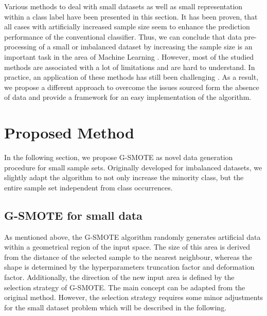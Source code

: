 \documentclass[parskip=full]{scrartcl}
\begin{document}
Various methods to deal with small datasets as well as small representation 
within a class label have been presented in this section. It has been proven, 
that all cases with artificially increased sample size seem to enhance the 
prediction performance of the conventional classifier. Thus, we can conclude 
that data pre-processing of a small or imbalanced dataset by increasing the 
sample size is an important task in the area of Machine Learning 
\cite{Ruparel.2013}. However, most of the studied methods are associated with a 
lot of limitations and are hard to understand. In practice, an application of 
these methods has still been challenging \cite{Sezer.2014}. As a result, we 
propose a different approach to overcome the issues sourced form the absence of 
data and provide a framework for an easy implementation of the algorithm.

\section{Proposed Method}

In the following section, we propose G-SMOTE as novel data generation procedure 
for small sample sets. Originally developed for imbalanced datasets, we 
slightly adapt the algorithm to not only increase the minority class, but the 
entire sample set independent from class occurrences. 

\subsection{G-SMOTE for small data}

As mentioned above, the G-SMOTE algorithm randomly generates artificial data 
within a geometrical region of the input space. The size of this area is 
derived from the distance of the selected sample to the nearest neighbour, 
whereas the shape is determined by the hyperparameters truncation factor and 
deformation factor. Additionally, the direction of the new input area is 
defined by the selection strategy of G-SMOTE. The main concept can be adapted 
from the original method. However, the selection strategy requires some minor 
adjustments for the small dataset problem which will be described in the 
following.
\end{document}
